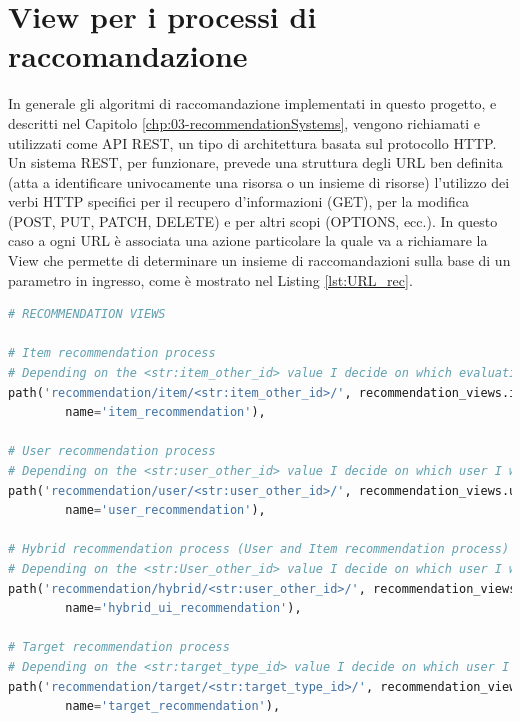 \section*{View per i processi di raccomandazione}
In generale gli algoritmi di raccomandazione implementati in questo progetto, e descritti nel Capitolo \ref{chp:03-recommendationSystems}, 
vengono richiamati e utilizzati come API REST, un tipo di architettura basata sul protocollo HTTP. Un sistema REST, per funzionare, prevede 
una struttura degli URL ben definita (atta a identificare univocamente una risorsa o un insieme di risorse) l'utilizzo dei verbi HTTP specifici 
per il recupero d'informazioni (GET), per la modifica (POST, PUT, PATCH, DELETE) e per altri scopi (OPTIONS, ecc.).\hfill\break
In questo caso a ogni URL è associata una azione particolare la quale va a richiamare la View che permette di determinare un insieme di 
raccomandazioni sulla base di un parametro in ingresso, come è mostrato nel Listing \ref{lst:URL_rec}.\hfill\break
\lstset{style=python_code_style}
\begin{lstlisting}[language=Python, label=lst:URL_rec, caption={Porzione parziale del codice contenuto nell'URL mapper per implementare 
    i sistemi di raccomandazione.}]
# RECOMMENDATION VIEWS
 
# Item recommendation process
# Depending on the <str:item_other_id> value I decide on which evaluation of the taxonomy I want to recommend on
path('recommendation/item/<str:item_other_id>/', recommendation_views.item_recommendation,
        name='item_recommendation'),
 
# User recommendation process
# Depending on the <str:user_other_id> value I decide on which user I want to recommend on
path('recommendation/user/<str:user_other_id>/', recommendation_views.user_recommendation,
        name='user_recommendation'),
 
# Hybrid recommendation process (User and Item recommendation process)
# Depending on the <str:User_other_id> value I decide on which user I want to recommend on with an hybrid approach
path('recommendation/hybrid/<str:user_other_id>/', recommendation_views.hybrid_recommendation,
        name='hybrid_ui_recommendation'),
 
# Target recommendation process
# Depending on the <str:target_type_id> value I decide on which user I want to recommend on
path('recommendation/target/<str:target_type_id>/', recommendation_views.target_recommendation,
        name='target_recommendation'),
\end{lstlisting}
